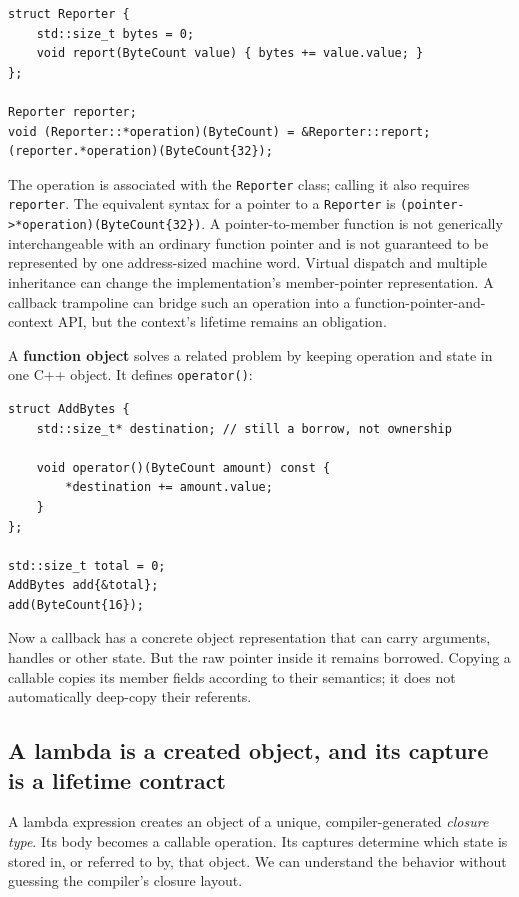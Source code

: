 \begin{verbatim}
struct Reporter {
    std::size_t bytes = 0;
    void report(ByteCount value) { bytes += value.value; }
};

Reporter reporter;
void (Reporter::*operation)(ByteCount) = &Reporter::report;
(reporter.*operation)(ByteCount{32});
\end{verbatim}

The operation is associated with the \texttt{Reporter} class; calling it also requires \texttt{reporter}. The equivalent syntax for a pointer to a \texttt{Reporter} is \texttt{(pointer-\textgreater{}*operation)(ByteCount\{32\})}. A pointer-to-member function is not generically interchangeable with an ordinary function pointer and is not guaranteed to be represented by one address-sized machine word. Virtual dispatch and multiple inheritance can change the implementation's member-pointer representation. A callback trampoline can bridge such an operation into a function-pointer-and-context API, but the context's lifetime remains an obligation.

A \textbf{function object} solves a related problem by keeping operation and state in one C++ object. It defines \texttt{operator()}:

\begin{verbatim}
struct AddBytes {
    std::size_t* destination; // still a borrow, not ownership

    void operator()(ByteCount amount) const {
        *destination += amount.value;
    }
};

std::size_t total = 0;
AddBytes add{&total};
add(ByteCount{16});
\end{verbatim}

Now a callback has a concrete object representation that can carry arguments, handles or other state. But the raw pointer inside it remains borrowed. Copying a callable copies its member fields according to their semantics; it does not automatically deep-copy their referents.

\subsection{A lambda is a created object, and its capture is a lifetime contract}\label{01-foundations-i-ch004-a-lambda-is-a-created-object-and-its-capture-is-a-lifetime-contract}

A lambda expression creates an object of a unique, compiler-generated \emph{closure type}. Its body becomes a callable operation. Its captures determine which state is stored in, or referred to by, that object. We can understand the behavior without guessing the compiler's closure layout.

